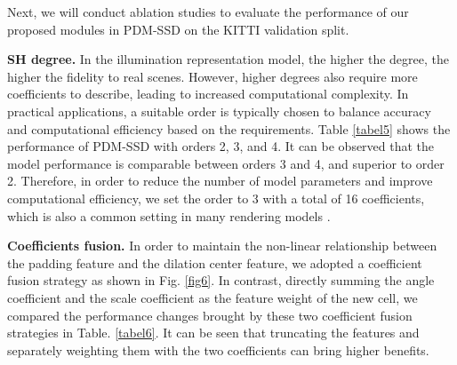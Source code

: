 

Next, we will conduct ablation studies to evaluate the performance of our proposed modules in PDM-SSD on the KITTI validation split.

\textbf{SH degree.} In the illumination representation model, the higher the degree, the higher the fidelity to real scenes. However, higher degrees also require more coefficients to describe, leading to increased computational complexity. In practical applications, a suitable order is typically chosen to balance accuracy and computational efficiency based on the requirements. Table \ref{tabel5} shows the performance of PDM-SSD with orders 2, 3, and 4. It can be observed that the model performance is comparable between orders 3 and 4, and superior to order 2. Therefore, in order to reduce the number of model parameters and improve computational efficiency, we set the order to 3 with a total of 16 coefficients, which is also a common setting in many rendering models \cite{fridovich2022plenoxels,kerbl20233d}.

\textbf{Coefficients fusion.} In order to maintain the non-linear relationship between the padding feature and the dilation center feature, we adopted a coefficient fusion strategy as shown in Fig. \ref{fig6}. In contrast, directly summing the angle coefficient and the scale coefficient as the feature weight of the new cell, we compared the performance changes brought by these two coefficient fusion strategies in Table. \ref{tabel6}. It can be seen that truncating the features and separately weighting them with the two coefficients can bring higher benefits.

